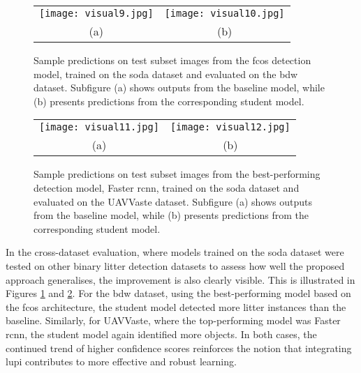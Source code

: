 \begin{figure}[!ht]
  \centering
  \begin{tabular}{cc}
    \texttt{[image: visual9.jpg]} &
    \texttt{[image: visual10.jpg]} \\
    \small (a) & \small (b) \\
  \end{tabular}
  \caption{Sample predictions on test subset images from the \gls{fcos} detection model, trained on the \gls{soda} dataset and evaluated on the \gls{bdw} dataset. Subfigure (a) shows outputs from the baseline model, while (b) presents predictions from the corresponding student model.}
  \label{fig:visuals_bdw}
\end{figure}

\begin{figure}[!ht]
  \centering
  \begin{tabular}{cc}
    \texttt{[image: visual11.jpg]} &
    \texttt{[image: visual12.jpg]} \\
    \small (a) & \small (b) \\
  \end{tabular}
  \caption{Sample predictions on test subset images from the best-performing detection model, Faster \gls{rcnn}, trained on the \gls{soda} dataset and evaluated on the UAVVaste dataset. Subfigure (a) shows outputs from the baseline model, while (b) presents predictions from the corresponding student model.}
  \label{fig:visuals_uavvaste}
\end{figure}

In the cross-dataset evaluation, where models trained on the \gls{soda} dataset were tested on other binary litter detection datasets to assess how well the proposed approach generalises, the improvement is also clearly visible. This is illustrated in Figures \ref{fig:visuals_bdw} and \ref{fig:visuals_uavvaste}.
For the \gls{bdw} dataset, using the best-performing model based on the \gls{fcos} architecture, the student model detected more litter instances than the baseline. Similarly, for UAVVaste, where the top-performing model was Faster \gls{rcnn}, the student model again identified more objects. In both cases, the continued trend of higher confidence scores reinforces the notion that integrating \gls{lupi} contributes to more effective and robust learning.

